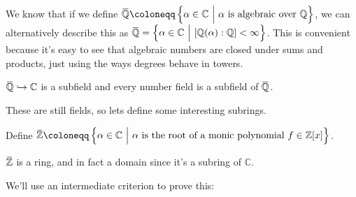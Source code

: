 \begin{remark}

We know that if we define
\(\mkern 1.5mu\overline{\mkern-1.5mu{\mathbb{Q}}\mkern-1.5mu}\mkern 1.5mu\coloneqq\left\{{\alpha\in {\mathbb{C}}{~\mathrel{\Big|}~}\alpha \text{ is algebraic over } {\mathbb{Q}}}\right\}\),
we can alternatively describe this as
\(\mkern 1.5mu\overline{\mkern-1.5mu{\mathbb{Q}}\mkern-1.5mu}\mkern 1.5mu= \left\{{ \alpha\in {\mathbb{C}}{~\mathrel{\Big|}~}[{\mathbb{Q}}(\alpha) : {\mathbb{Q}}] < \infty }\right\}\).
This is convenient because it's easy to see that algebraic numbers are
closed under sums and products, just using the ways degrees behave in
towers.

\end{remark}

\begin{corollary}

\(\mkern 1.5mu\overline{\mkern-1.5mu{\mathbb{Q}}\mkern-1.5mu}\mkern 1.5mu\hookrightarrow{\mathbb{C}}\)
is a subfield and every number field is a subfield of
\(\mkern 1.5mu\overline{\mkern-1.5mu{\mathbb{Q}}\mkern-1.5mu}\mkern 1.5mu\).

\end{corollary}

\begin{remark}

These are still fields, so lets define some interesting subrings.

\end{remark}

\begin{definition}[$\bar \ZZ$ ]

Define
\(\mkern 1.5mu\overline{\mkern-1.5mu{\mathbb{Z}}\mkern-1.5mu}\mkern 1.5mu\coloneqq\left\{{ \alpha\in {\mathbb{C}}{~\mathrel{\Big|}~}\alpha\text{ is the root of a monic polynomial }f\in {\mathbb{Z}}[x]}\right\}\).

\end{definition}

\begin{theorem}

\(\mkern 1.5mu\overline{\mkern-1.5mu{\mathbb{Z}}\mkern-1.5mu}\mkern 1.5mu\)
is a ring, and in fact a domain since it's a subring of
\({\mathbb{C}}\).

\end{theorem}

\begin{remark}

We'll use an intermediate criterion to prove this:

\end{remark}

